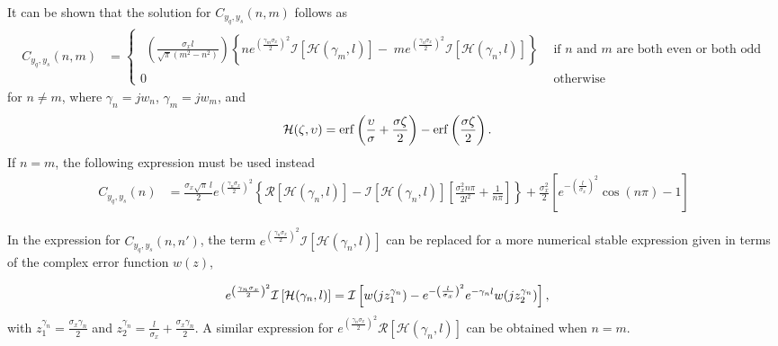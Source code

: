\documentclass[a4paper,10pt]{article}
\DeclareMathOperator{\erf}{erf}
\begin{document}
It can be shown \cite{Alvarez:HeatEquationReport} that the solution
for $C_{y_q,y_s}(n,m)$ follows as
\begin{align}\label{eq:Cyqys_nm}
 C_{y_q,y_s}(n,m)&=
\begin{cases}
\begin{aligned}
\left(\frac{\sigma_x
l}{\sqrt{\pi}(m^2-n^2)}\right)\left\{ne^{\left(\frac{\gamma_m\sigma_x}{2}\right)^2}\mathcal{I}\left[\mathcal{H}
(\gamma_m,l)\right]-\;me^{\left(\frac{\gamma_n\sigma_x}{2}\right)^2}\mathcal{I}\left[\mathcal{H}(\gamma_n,l)\right]\right\}
\end{aligned}  & \mbox{if }n\mbox{ and }m\mbox{ are both even or both odd}\\
0&\mbox{otherwise}
\end{cases}
\end{align}
for $n\neq m$, where $\gamma_n=j w_n$, $\gamma_m=j w_m$, and  
\begin{align}
\notag \mathcal{H}(\zeta,\upsilon)&=\erf\left(\frac{\upsilon}{\sigma}+\frac{\sigma \zeta}{2}\right)-\erf\left(\frac{\sigma \zeta}{2}\right).
%
\end{align}
If $n=m$, the following expression must be used instead
\begin{align*}
C_{y_q,y_s}(n)
&=\frac{\sigma_x\sqrt{\pi}\,l}{2}e^{\left(\frac{\gamma_n\sigma_x}{2}\right)^2}\left\{\mathcal{R}\left[\mathcal{H}(\gamma_n,l)\right]
-\mathcal{I}\left[\mathcal{H}(\gamma_n,l)\right]\left[\frac{\sigma_x^2n\pi}{2l^2}+\frac{1}{n\pi}\right]\right\}
+\frac{\sigma^2_x}{2}\left[e^{-(\frac{l}{\sigma_x})^2}\cos(n\pi)-1\right]
\end{align*}

In the expression for $C_{y_q,y_s}(n,n')$, the term
$e^{\left(\frac{\gamma_n\sigma_x}{2}\right)^2}\mathcal{I}\left[\mathcal{H}
(\gamma_n,l)\right]$ can be replaced for a more numerical stable expression given in terms
of the complex error function $w(z)$,

\begin{align}
\notag
e^{\left(\frac{\gamma_n\sigma_x}{2}\right)^2}\mathcal{I}\left[\mathcal{H}(\gamma_n,l)\right]&= 
\mathcal{I}\left[w(jz_1^{\gamma_n})-e^{-\left(\frac{l}{\sigma_x}\right)^2}e^{-\gamma_nl}w(jz_2^{\gamma_n})\right],
\end{align}
with $z_1^{\gamma_n}=\frac{\sigma_x\gamma_n}{2}$ and $z_2^{\gamma_n}=\frac{l}{\sigma_x}+\frac{\sigma_x\gamma_n}{2}$. A similar expression for $e^{\left(\frac{\gamma_n\sigma_x}{2}\right)^2}\mathcal{R}\left[\mathcal{H}
(\gamma_n,l)\right]$ can be obtained when $n=m$.
\end{document}
